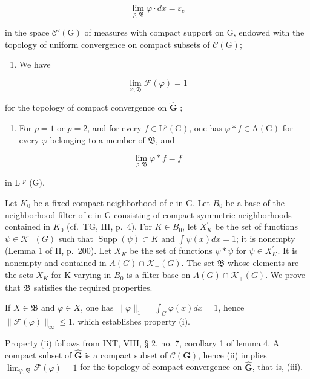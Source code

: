\[
\lim _ {\varphi , \mathfrak {B}} \varphi \cdot d x = \varepsilon_ {e}
\]

in the space \(\mathcal{C}'(\mathrm{G})\) of measures with compact support on G, endowed with the topology of uniform convergence on compact subsets of \(\mathcal{C}(\mathrm{G})\);

\begin{enumerate}
\def\labelenumi{(\roman{enumi})}
\setcounter{enumi}{2}
\tightlist
\item
  We have
\end{enumerate}

\[
\lim _ {\varphi , \mathfrak {B}} \mathcal {F} (\varphi) = 1
\]

for the topology of compact convergence on \(\widehat{\mathbf{G}}\) ;

\begin{enumerate}
\def\labelenumi{(\roman{enumi})}
\setcounter{enumi}{3}
\tightlist
\item
  For \(p = 1\) or \(p = 2\), and for every \(f \in \mathrm{L}^p(\mathrm{G})\), one has \(\varphi * f \in \mathrm{A}(\mathrm{G})\) for every \(\varphi\) belonging to a member of \(\mathfrak{B}\), and
\end{enumerate}

\[
\lim _ {\varphi , \mathfrak {B}} \varphi * f = f
\]

in L \(^{p}\) (G).

Let \(K_{0}\) be a fixed compact neighborhood of e in G. Let \(B_{0}\) be a base of the neighborhood filter of e in G consisting of compact symmetric neighborhoods contained in \(K_{0}\) (cf.~TG, III, p.~4). For \(K \in B_{0}\), let \(X_{K}^{\prime}\) be the set of functions \(\psi \in \mathcal{K}_{+}(G)\) such that \(\operatorname{Supp}(\psi) \subset K\) and \(\int \psi(x)dx = 1\); it is nonempty (Lemma 1 of II, p.~200). Let \(X_{K}\) be the set of functions \(\psi * \psi\) for \(\psi \in X_{K}^{\prime}\). It is nonempty and contained in \(A(G) \cap \mathcal{K}_{+}(G)\). The set \(\mathfrak{B}\) whose elements are the sets \(X_{K}\) for K varying in \(B_{0}\) is a filter base on \(A(G) \cap \mathcal{K}_{+}(G)\). We prove that \(\mathfrak{B}\) satisfies the required properties.

If \(X \in \mathfrak{B}\) and \(\varphi \in X\), one has \(\| \varphi \|_1 = \int_{G} \varphi(x) dx = 1\), hence \(\| \mathcal{F}(\varphi) \|_\infty \leqslant 1\), which establishes property (i).

Property (ii) follows from INT, VIII, § 2, no. 7, corollary 1 of lemma 4. A compact subset of \(\widehat{\mathbf{G}}\) is a compact subset of \(\mathcal{C}(\mathbf{G})\), hence (ii) implies \(\lim_{\varphi, \mathfrak{B}} \mathcal{F}(\varphi) = 1\) for the topology of compact convergence on \(\widehat{\mathbf{G}}\), that is, (iii).

